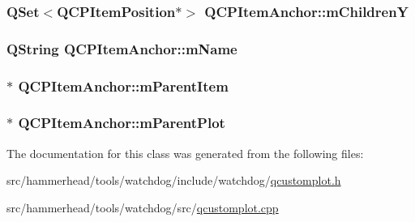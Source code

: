 \subsubsection[{\texorpdfstring{m\+ChildrenY}{mChildrenY}}]{\setlength{\rightskip}{0pt plus 5cm}Q\+Set$<${\bf Q\+C\+P\+Item\+Position}$\ast$$>$ Q\+C\+P\+Item\+Anchor\+::m\+ChildrenY\hspace{0.3cm}{\ttfamily [protected]}}\hypertarget{classQCPItemAnchor_a3abe4eebd0683454d81c8341df6f7115}{}\label{classQCPItemAnchor_a3abe4eebd0683454d81c8341df6f7115}
\subsubsection[{\texorpdfstring{m\+Name}{mName}}]{\setlength{\rightskip}{0pt plus 5cm}Q\+String Q\+C\+P\+Item\+Anchor\+::m\+Name\hspace{0.3cm}{\ttfamily [protected]}}\hypertarget{classQCPItemAnchor_a23ad4d0ab0d2cbb41a7baf05bcf996ec}{}\label{classQCPItemAnchor_a23ad4d0ab0d2cbb41a7baf05bcf996ec}
\subsubsection[{\texorpdfstring{m\+Parent\+Item}{mParentItem}}]{$\ast$ Q\+C\+P\+Item\+Anchor\+::m\+Parent\+Item\hspace{0.3cm}{\ttfamily [protected]}}\hypertarget{classQCPItemAnchor_a80fad480ad3bb980446ed6ebc00818ae}{}\label{classQCPItemAnchor_a80fad480ad3bb980446ed6ebc00818ae}
\subsubsection[{\texorpdfstring{m\+Parent\+Plot}{mParentPlot}}]{$\ast$ Q\+C\+P\+Item\+Anchor\+::m\+Parent\+Plot\hspace{0.3cm}{\ttfamily [protected]}}\hypertarget{classQCPItemAnchor_a59b968410831ba91a25cc75a77dde6f5}{}\label{classQCPItemAnchor_a59b968410831ba91a25cc75a77dde6f5}


The documentation for this class was generated from the following files\+:\begin{DoxyCompactItemize}
\item 
src/hammerhead/tools/watchdog/include/watchdog/\hyperlink{qcustomplot_8h}{qcustomplot.\+h}\item 
src/hammerhead/tools/watchdog/src/\hyperlink{qcustomplot_8cpp}{qcustomplot.\+cpp}\end{DoxyCompactItemize}
